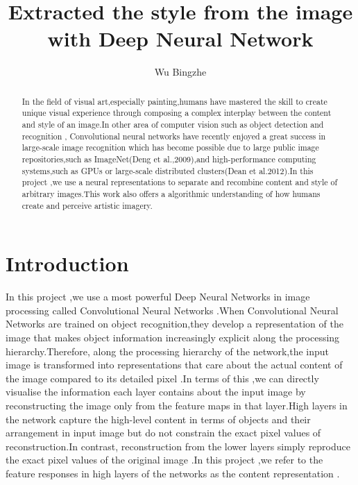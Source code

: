 \documentclass[10pt,a4paper]{article}
\author{Wu Bingzhe}
\title{Extracted the style from the image\\with Deep Neural Network}
\begin{document}
	\maketitle
	\begin{abstract}
		
		In the field of visual art,especially painting,humans have mastered the 
		skill to create unique visual experience through composing a complex interplay
		between the content and style of an image.In other area of computer vision such as object detection and recognition , Convolutional neural networks 
		have recently enjoyed a great success in large-scale image recognition\cite{Krizhevsky2012ImageNet} which has become possible due to large public image repositories,such as ImageNet(Deng et al.,2009),and high-performance computing systems,such as GPUs
		or large-scale distributed clusters\cite{Deng2012Large}(Dean et al.2012).In this project ,we use 
		a neural representations to separate and recombine content and style of arbitrary images.This work also offers a algorithmic understanding of how
		humans create and perceive artistic imagery.
	\end{abstract}
	
	
	
	
	

	
	
	
	\section{Introduction}
	In this project ,we use a most powerful Deep Neural Networks in image processing called Convolutional Neural 
	Networks .When Convolutional Neural Networks are trained on object recognition,they develop a representation of the image that makes object
	information increasingly explicit along the processing hierarchy.Therefore,
	along the processing hierarchy of the network,the input image is transformed
	into representations that care about the actual content of the image compared
	to its detailed pixel .In terms of this ,we can directly visualise the information each layer contains about the input image by reconstructing the image 
	only from the feature maps in that layer.High layers in the network capture the high-level content in terms of objects and their arrangement in input image but do not constrain the exact pixel values of reconstruction.In contrast, reconstruction from the lower layers simply reproduce the exact
	pixel values of the original image .In this project ,we refer to the feature 
	responses in high layers of the networks as the content representation\cite{DBLP:journals/corr/GatysEB15a} .
	
\end{document}
